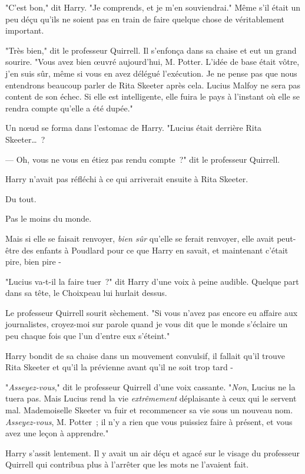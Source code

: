 "C'est bon," dit Harry. "Je comprends, et je m'en souviendrai." Même s'il était un peu déçu qu'ils ne soient pas en train de faire quelque chose de véritablement important.

"Très bien," dit le professeur Quirrell. Il s'enfonça dans sa chaise et eut un grand sourire. "Vous avez bien œuvré aujourd'hui, M. Potter. L'idée de base était vôtre, j'en suis sûr, même si vous en avez délégué l'exécution. Je ne pense pas que nous entendrons beaucoup parler de Rita Skeeter après cela. Lucius Malfoy ne sera pas content de son échec. Si elle est intelligente, elle fuira le pays à l'instant où elle se rendra compte qu'elle a été dupée."

Un nœud se forma dans l'estomac de Harry. "Lucius était derrière Rita Skeeter…~?

--- Oh, vous ne vous en étiez pas rendu compte~?" dit le professeur Quirrell.

Harry n'avait pas réfléchi à ce qui arriverait ensuite à Rita Skeeter.

Du tout.

Pas le moins du monde.

Mais si elle se faisait renvoyer, \emph{bien sûr} qu'elle se ferait renvoyer, elle avait peut-être des enfants à Poudlard pour ce que Harry en savait, et maintenant c'était pire, bien pire -

"Lucius va-t-il la faire tuer~?" dit Harry d'une voix à peine audible. Quelque part dans sa tête, le Choixpeau lui hurlait dessus.

Le professeur Quirrell sourit sèchement. "Si vous n'avez pas encore eu affaire aux journalistes, croyez-moi sur parole quand je vous dit que le monde s'éclaire un peu chaque fois que l'un d'entre eux s'éteint."

Harry bondit de sa chaise dans un mouvement convulsif, il fallait qu'il trouve Rita Skeeter et qu'il la prévienne avant qu'il ne soit trop tard -

"\emph{Asseyez-vous}," dit le professeur Quirrell d'une voix cassante. "\emph{Non}, Lucius ne la tuera pas. Mais Lucius rend la vie \emph{extrêmement} déplaisante à ceux qui le servent mal. Mademoiselle Skeeter va fuir et recommencer sa vie sous un nouveau nom. \emph{Asseyez-vous}, M. Potter~; il n'y a rien que vous puissiez faire à présent, et vous avez une leçon à apprendre."

Harry s'assit lentement. Il y avait un air déçu et agacé sur le visage du professeur Quirrell qui contribua plus à l'arrêter que les mots ne l'avaient fait.

